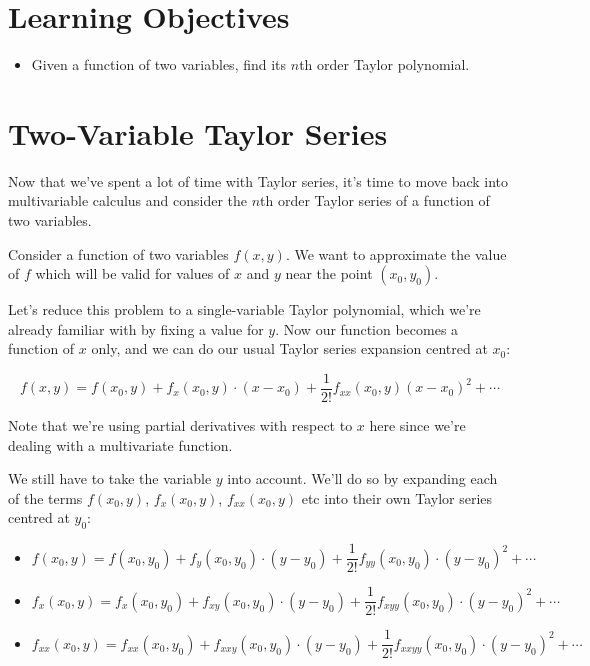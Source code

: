\documentclass[
]{book}
\providecommand{\tightlist}{%
  \setlength{\itemsep}{0pt}\setlength{\parskip}{0pt}}
\theoremstyle{definition}
\theoremstyle{definition}
\theoremstyle{definition}
\theoremstyle{definition}
\theoremstyle{remark}
\begin{document}
\hypertarget{learning-objectives-33}{%
\section{Learning Objectives}\label{learning-objectives-33}}

\begin{itemize}
\tightlist
\item
  Given a function of two variables, find its \(n\)th order Taylor polynomial.
\end{itemize}

\hypertarget{two-variable-taylor-series}{%
\section{Two-Variable Taylor Series}\label{two-variable-taylor-series}}

Now that we've spent a lot of time with Taylor series, it's time to move back into multivariable calculus and consider the \(n\)th order Taylor series of a function of two variables.

Consider a function of two variables \(f(x,y)\). We want to approximate the value of \(f\) which will be valid for values of \(x\) and \(y\) near the point \((x_0,y_0)\).

Let's reduce this problem to a single-variable Taylor polynomial, which we're already familiar with by fixing a value for \(y\). Now our function becomes a function of \(x\) only, and we can do our usual Taylor series expansion centred at \(x_0\):

\[f(x,y)=f(x_0,y)+f_x(x_0,y)\cdot(x-x_0)+\dfrac{1}{2!}f_{xx}(x_0,y)(x-x_0)^2+\cdots\]

Note that we're using partial derivatives with respect to \(x\) here since we're dealing with a multivariate function.

We still have to take the variable \(y\) into account. We'll do so by expanding each of the terms \(f(x_0,y)\), \(f_x(x_0,y)\), \(f_{xx}(x_0,y)\) etc into their own Taylor series centred at \(y_0\):

\begin{itemize}
\tightlist
\item
  \(f(x_0,y)=f(x_0,y_0)+f_y(x_0,y_0)\cdot(y-y_0)+\dfrac{1}{2!}f_{yy}(x_0,y_0)\cdot(y-y_0)^2+\cdots\)
\item
  \(f_x(x_0,y)=f_x(x_0,y_0)+f_{xy}(x_0,y_0)\cdot(y-y_0)+\dfrac{1}{2!}f_{xyy}(x_0,y_0)\cdot(y-y_0)^2+\cdots\)
\item
  \(f_{xx}(x_0,y)=f_{xx}(x_0,y_0)+f_{xxy}(x_0,y_0)\cdot(y-y_0)+\dfrac{1}{2!}f_{xxyy}(x_0,y_0)\cdot(y-y_0)^2+\cdots\)
\end{itemize}
\end{document}
